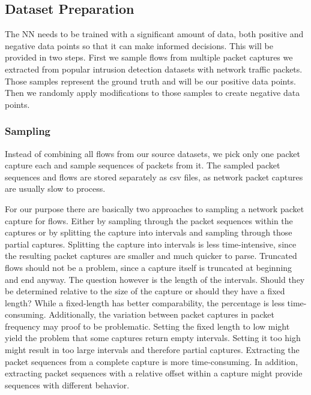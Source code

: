 \documentclass[
	ngerman,
	ruledheaders=section,%
	class=report,%
	thesis={type=bachelor},%
	accentcolor=9c,%
	custommargins=true,%
	marginpar=false,%
	parskip=half-,%
	fontsize=11pt,%
]{tudapub}
\begin{document}
\subsection{Dataset Preparation}

The NN needs to be trained with a significant amount of data, both positive and negative data points so that it can make informed decisions.
This will be provided in two steps.
First we sample flows from multiple packet captures we extracted from popular intrusion detection datasets with network traffic packets.
Those samples represent the ground truth and will be our positive data points.
Then we randomly apply modifications to those samples to create negative data points.

\subsubsection{Sampling}

Instead of combining all flows from our source datasets, we pick only one packet capture each and sample sequences of packets from it.
The sampled packet sequences and flows are stored separately as csv files, as network packet captures are usually slow to process.

For our purpose there are basically two approaches to sampling a network packet capture for flows.
Either by sampling through the packet sequences within the captures or by splitting the capture into intervals and sampling through those partial captures.
Splitting the capture into intervals is less time-intensive, since the resulting packet captures are smaller and much quicker to parse.
Truncated flows should not be a problem, since a capture itself is truncated at beginning and end anyway.
The question however is the length of the intervals.
Should they be determined relative to the size of the capture or should they have a fixed length?
While a fixed-length has better comparability, the percentage is less time-consuming.
Additionally, the variation between packet captures in packet frequency may proof to be problematic.
Setting the fixed length to low might yield the problem that some captures return empty intervals.
Setting it too high might result in too large intervals and therefore partial captures.
Extracting the packet sequences from a complete capture is more time-consuming.
In addition, extracting packet sequences with a relative offset within a capture might provide sequences with different behavior.
\end{document}
